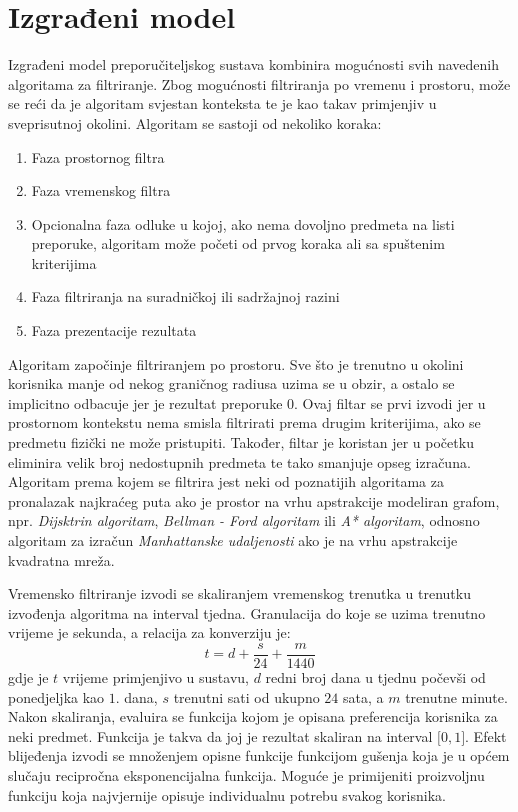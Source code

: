 \documentclass[times, utf8, diplomski, numeric]{fer}
\begin{document}
\section{Izgrađeni model}

Izgrađeni model preporučiteljskog sustava kombinira mogućnosti svih navedenih
algoritama za filtriranje. Zbog mogućnosti filtriranja po vremenu i prostoru,
može se reći da je algoritam svjestan konteksta te je kao takav primjenjiv u
sveprisutnoj okolini. Algoritam se sastoji od nekoliko koraka:
\begin{enumerate}
  \item Faza prostornog filtra
  \item Faza vremenskog filtra
  \item Opcionalna faza odluke u kojoj, ako nema dovoljno predmeta na listi
  preporuke, algoritam može početi od prvog koraka ali sa spuštenim kriterijima
  \item Faza filtriranja na suradničkoj ili sadržajnoj razini
  \item Faza prezentacije rezultata
\end{enumerate}

Algoritam započinje filtriranjem po prostoru. Sve što je trenutno u okolini
korisnika manje od nekog graničnog radiusa uzima se u obzir, a ostalo se
implicitno odbacuje jer je rezultat preporuke $0$. Ovaj filtar se prvi izvodi
jer u prostornom kontekstu nema smisla filtrirati prema drugim kriterijima, ako
se predmetu fizički ne može pristupiti. Također, filtar je koristan jer u
početku eliminira velik broj nedostupnih predmeta te tako smanjuje opseg
izračuna. Algoritam prema kojem se filtrira jest neki od poznatijih algoritama
za pronalazak najkraćeg puta ako je prostor na vrhu apstrakcije modeliran
grafom, npr. \emph{Dijsktrin algoritam}, \emph{Bellman - Ford algoritam} ili
\emph{A* algoritam}, odnosno algoritam za izračun \emph{Manhattanske
udaljenosti} ako je na vrhu apstrakcije kvadratna mreža.

Vremensko filtriranje izvodi se skaliranjem vremenskog trenutka u trenutku
izvođenja algoritma na interval tjedna. Granulacija do koje se uzima trenutno
vrijeme je sekunda, a relacija za konverziju je:
\begin{equation}
\label{eq:timeconv}
	t = d + \frac{s}{24} + \frac{m}{1440}
\end{equation}
gdje je $t$ vrijeme primjenjivo u sustavu, $d$ redni broj dana u tjednu počevši
od ponedjeljka kao $1$. dana, $s$ trenutni sati od ukupno $24$ sata, a $m$
trenutne minute. Nakon skaliranja, evaluira se funkcija kojom je opisana
preferencija korisnika za neki predmet. Funkcija je takva da joj je rezultat
skaliran na interval $\big[0, 1\big]$. Efekt blijeđenja  izvodi
se množenjem opisne funkcije funkcijom gušenja koja je u općem slučaju
recipročna eksponencijalna funkcija. Moguće je primijeniti proizvoljnu funkciju
koja najvjernije opisuje individualnu potrebu svakog korisnika.
\end{document}
